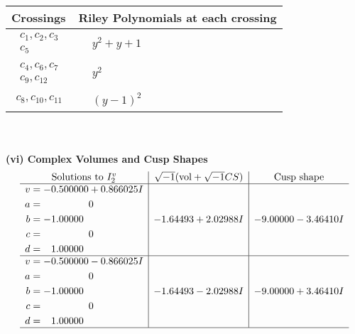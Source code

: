 \documentclass[1p]{elsarticle_modified}
\theoremstyle{definition}
\newcommand{\I}{\sqrt{-1}}
\begin{document}
\begin{tabular}{m{50pt}|m{274pt}}
Crossings & \hspace{64pt}Riley Polynomials at each crossing \\
\hline $$\begin{aligned}c_{1},c_{2},c_{3}\\c_{5}\end{aligned}$$&$\begin{aligned}
&y^2+y+1
\end{aligned}$\\
\hline $$\begin{aligned}c_{4},c_{6},c_{7}\\c_{9},c_{12}\end{aligned}$$&$\begin{aligned}
&y^2
\end{aligned}$\\
\hline $$\begin{aligned}c_{8},c_{10},c_{11}\end{aligned}$$&$\begin{aligned}
&(y-1)^2
\end{aligned}$\\
\hline
\end{tabular}\\~\\
\newpage\flushleft \textbf{(vi) Complex Volumes and Cusp Shapes}
$$\begin{array}{c|c|c}  
\text{Solutions to }I^v_{2}& \I (\text{vol} + \sqrt{-1}CS) & \text{Cusp shape}\\
 \hline 
\begin{aligned}
v &= -0.500000 + 0.866025 I \\
a &= \phantom{-0.000000 } 0 \\
b &= -1.00000\phantom{ +0.000000I} \\
c &= \phantom{-0.000000 } 0 \\
d &= \phantom{-}1.00000\phantom{ +0.000000I}\end{aligned}
 & -1.64493 + 2.02988 I & -9.00000 - 3.46410 I \\ \hline\begin{aligned}
v &= -0.500000 - 0.866025 I \\
a &= \phantom{-0.000000 } 0 \\
b &= -1.00000\phantom{ +0.000000I} \\
c &= \phantom{-0.000000 } 0 \\
d &= \phantom{-}1.00000\phantom{ +0.000000I}\end{aligned}
 & -1.64493 - 2.02988 I & -9.00000 + 3.46410 I\\
 \hline 
 \end{array}$$\newpage\newpage\renewcommand{\arraystretch}{1}
\end{document}
